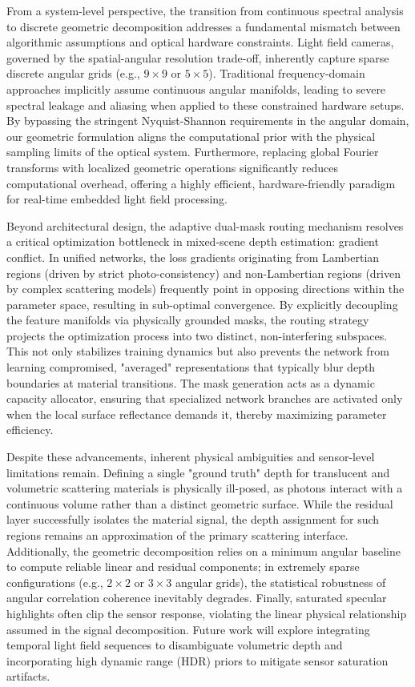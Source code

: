 From a system-level perspective, the transition from continuous spectral analysis to discrete geometric decomposition addresses a fundamental mismatch between algorithmic assumptions and optical hardware constraints. Light field cameras, governed by the spatial-angular resolution trade-off, inherently capture sparse discrete angular grids (e.g., $9 \times 9$ or $5 \times 5$). Traditional frequency-domain approaches implicitly assume continuous angular manifolds, leading to severe spectral leakage and aliasing when applied to these constrained hardware setups. By bypassing the stringent Nyquist-Shannon requirements in the angular domain, our geometric formulation aligns the computational prior with the physical sampling limits of the optical system. Furthermore, replacing global Fourier transforms with localized geometric operations significantly reduces computational overhead, offering a highly efficient, hardware-friendly paradigm for real-time embedded light field processing.

Beyond architectural design, the adaptive dual-mask routing mechanism resolves a critical optimization bottleneck in mixed-scene depth estimation: gradient conflict. In unified networks, the loss gradients originating from Lambertian regions (driven by strict photo-consistency) and non-Lambertian regions (driven by complex scattering models) frequently point in opposing directions within the parameter space, resulting in sub-optimal convergence. By explicitly decoupling the feature manifolds via physically grounded masks, the routing strategy projects the optimization process into two distinct, non-interfering subspaces. This not only stabilizes training dynamics but also prevents the network from learning compromised, "averaged" representations that typically blur depth boundaries at material transitions. The mask generation acts as a dynamic capacity allocator, ensuring that specialized network branches are activated only when the local surface reflectance demands it, thereby maximizing parameter efficiency.

Despite these advancements, inherent physical ambiguities and sensor-level limitations remain. Defining a single "ground truth" depth for translucent and volumetric scattering materials is physically ill-posed, as photons interact with a continuous volume rather than a distinct geometric surface. While the residual layer successfully isolates the material signal, the depth assignment for such regions remains an approximation of the primary scattering interface. Additionally, the geometric decomposition relies on a minimum angular baseline to compute reliable linear and residual components; in extremely sparse configurations (e.g., $2 \times 2$ or $3 \times 3$ angular grids), the statistical robustness of angular correlation coherence inevitably degrades. Finally, saturated specular highlights often clip the sensor response, violating the linear physical relationship assumed in the signal decomposition. Future work will explore integrating temporal light field sequences to disambiguate volumetric depth and incorporating high dynamic range (HDR) priors to mitigate sensor saturation artifacts.


